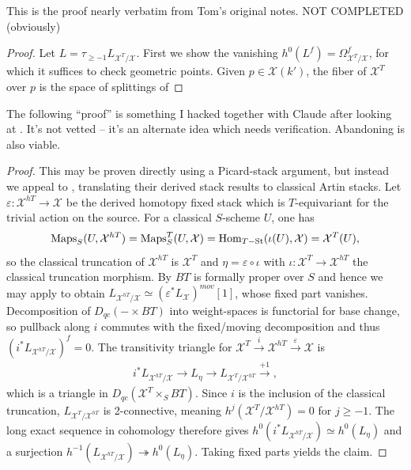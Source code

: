 \documentclass[12pt,dvipsnames]{amsart}
\newcommand{\red}[1]{\textcolor{Mahogany}{#1}}
\begin{document}
\red{This is the proof nearly verbatim from Tom's original notes. NOT COMPLETED (obviously)}
\begin{proof}
  Let \(L = \tau_{\geq -1}L_{\mathcal X^T/\mathcal X}\). First we show the vanishing \(h^0(L^f) = \Omega^f_{\mathcal X^T/\mathcal X}\), for which it suffices to check geometric points. Given \(p\in \mathcal X(k')\), the fiber of \(\mathcal X^T\) over \(p\) is the space of splittings of 
\end{proof}
\red{The following ``proof'' is something I hacked together with Claude after looking at \cite[Corollary A.31]{aranha-khan-latyntsev-etal_VirtualLocalizationRevisited2025}. It's not vetted -- it's an alternate idea which needs verification. Abandoning is also viable.}
\begin{proof}
  This may be proven directly using a Picard-stack argument, but instead we appeal to \cite[Cor. A.31]{aranha-khan-latyntsev-etal_VirtualLocalizationRevisited2025}, translating their derived stack results to classical Artin stacks.
  Let \(\varepsilon:\mathcal X^{hT}\to \mathcal X\) be the derived homotopy fixed stack \cite[Def. A.14, Rem A.15]{aranha-khan-latyntsev-etal_VirtualLocalizationRevisited2025} which is \(T\)-equivariant for the trivial action on the source. For a classical \(S\)-scheme \(U\), one has
  \begin{align*}
    \operatorname{Maps}_S(U,\mathcal X^{hT}) = \operatorname{Maps}_S^T(U, \mathcal X) = \operatorname{Hom}_{T-\operatorname{St}}(\iota(U), \mathcal X) = \mathcal X^T(U),
  \end{align*}
  so the classical truncation of \(\mathcal X^{hT}\) is \(\mathcal X^T\) and \(\eta = \varepsilon \circ \iota\) with \(\iota:\mathcal X^T\to \mathcal X^{hT}\) the classical truncation morphism. By \cite[Rem. A.19]{aranha-khan-latyntsev-etal_VirtualLocalizationRevisited2025} \(BT\) is formally proper over \(S\) and hence we may apply \cite[Cor. A.31]{aranha-khan-latyntsev-etal_VirtualLocalizationRevisited2025} to obtain \(L_{\mathcal X^{hT}/\mathcal X}\simeq (\varepsilon^*L_{\mathcal X})^{mov}[1]\), whose fixed part vanishes. Decomposition of \(D_{qc}(-\times BT)\) into weight-spaces is functorial for base change, so pullback along \(i\) commutes with the fixed/moving decomposition and thus \((i^*L_{\mathcal X^{hT}/\mathcal X})^{f} = 0\). The transitivity triangle for \(\mathcal X^T\xrightarrow{i}\mathcal X^{hT}\xrightarrow{\varepsilon}\mathcal X\) is
  \begin{align*}
    i^*L_{\mathcal X^{hT}/\mathcal X} \to L_\eta \to L_{\mathcal X^T/\mathcal X^{hT}} \xrightarrow{+1},
  \end{align*}
  which is a triangle in \(D_{qc}(\mathcal X^{T}\times_SBT)\). Since \(i\) is the inclusion of the classical truncation, \(L_{\mathcal X^T/\mathcal X^{hT}}\) is 2-connective, meaning \(h^j(\mathcal X^T/\mathcal X^{hT}) = 0\) for \(j \geq -1\). The long exact sequence in cohomology therefore gives \(h^0(i^*L_{\mathcal X^{hT}/\mathcal X}) \simeq h^0(L_\eta)\) and a surjection \(h^{-1}(L_{\mathcal X^{hT}/\mathcal X}) \twoheadrightarrow h^0(L_\eta)\). Taking fixed parts yields the claim.
\end{proof}
\end{document}
